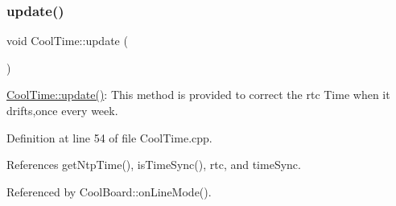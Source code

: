 \subsubsection{\texorpdfstring{update()}{update()}}
{\footnotesize\ttfamily void Cool\+Time\+::update (\begin{DoxyParamCaption}{ }\end{DoxyParamCaption})}

\hyperlink{classCoolTime_aae601f795452cfa48d9fb337aed483a8}{Cool\+Time\+::update()}\+: This method is provided to correct the rtc Time when it drifts,once every week. 

Definition at line 54 of file Cool\+Time.\+cpp.



References get\+Ntp\+Time(), is\+Time\+Sync(), rtc, and time\+Sync.



Referenced by Cool\+Board\+::on\+Line\+Mode().


